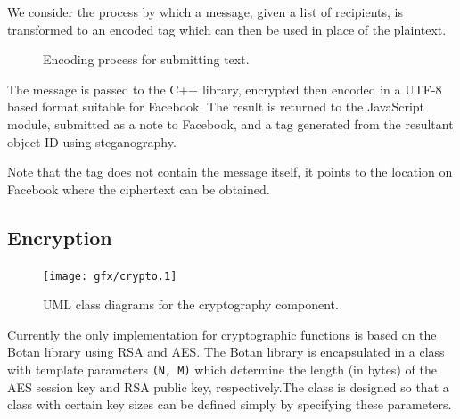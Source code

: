 We consider the process by which a message, given a list of recipients, is transformed to an encoded tag which can then be used in place of the plaintext. 

    \begin{figure}[tb]
        \begin{center}
                
            \caption{Encoding process for submitting text.}
            \label{tikz:text}
        \end{center}
    \end{figure}

The message is passed to the C++ library, encrypted then encoded in a UTF-8 based format suitable for Facebook. The result is returned to the JavaScript module, submitted as a note to Facebook, and a tag generated from the resultant object ID using steganography.

Note that the tag does not contain the message itself, it points to the location on Facebook where the ciphertext can be obtained.

\subsection{Encryption}
\label{ssec:encrypt}

    \begin{figure}[tb]
        \begin{center}
                \texttt{[image: gfx/crypto.1]}
            \caption{UML class diagrams for the cryptography component.}
            \label{uml:crypto}
        \end{center}
    \end{figure}
    
Currently the only implementation for cryptographic functions is based on the Botan library using RSA and AES. The Botan library is encapsulated in a class with template parameters {\tt (N, M)} which determine the length (in bytes) of the AES session key and RSA public key, respectively.The class is designed so that a class with certain key sizes can be defined simply by specifying these parameters.
    
